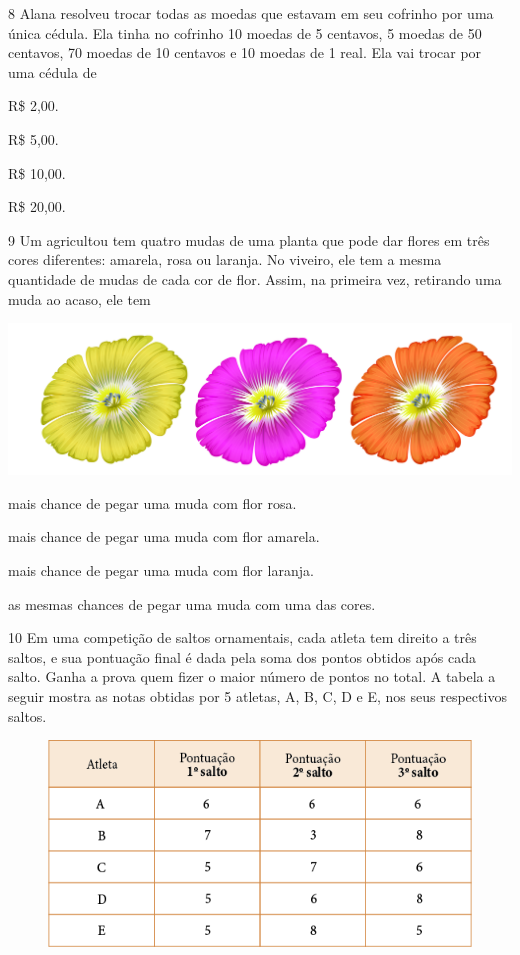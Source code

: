 \num{8} Alana resolveu trocar todas as moedas que estavam em seu cofrinho por uma
única cédula. Ela tinha no cofrinho 10 moedas de 5 centavos, 5 moedas de
50 centavos, 70 moedas de 10 centavos e 10 moedas de 1 real. Ela vai trocar por uma cédula de

\begin{escolha}
\item R\$ 2,00.
\item R\$ 5,00.
\item R\$ 10,00.
\item R\$ 20,00.
\end{escolha}


\num{9} Um agricultou tem quatro mudas de uma planta que pode dar flores em três cores diferentes: amarela, rosa ou laranja. No viveiro, ele tem a mesma quantidade de mudas de cada cor de flor. Assim, na primeira vez, retirando uma muda ao acaso, ele tem

\includegraphics[width=\textwidth]{media/image87a.jpeg}

\begin{escolha}
\item mais chance de pegar uma muda com flor rosa.
\item mais chance de pegar uma muda com flor amarela.
\item mais chance de pegar uma muda com flor laranja.
\item as mesmas chances de pegar uma muda com uma das cores.
\end{escolha}


\num{10} Em uma competição de saltos ornamentais, cada atleta tem direito a três saltos,
e sua pontuação final é dada pela soma dos pontos obtidos após cada salto. Ganha a prova quem
fizer o maior número de pontos no total. A tabela a seguir mostra as notas obtidas por 5 atletas, A, B, C, D e E, nos seus respectivos saltos.

\pagebreak
\begin{figure}[htpb!]
\centering
\includegraphics[width=\textwidth]{media/image88.png}
\end{figure}

